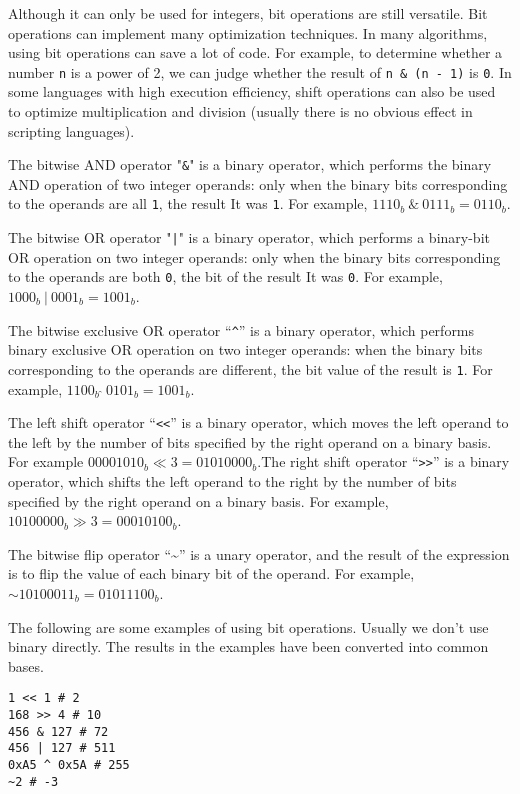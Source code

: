 Although it can only be used for integers, bit operations are still versatile. Bit operations can implement many optimization techniques. In many algorithms, using bit operations can save a lot of code. For example, to determine whether a number \texttt{n} is a power of 2, we can judge whether the result of \texttt{n \& (n - 1)} is \texttt{0}. In some languages   with high execution efficiency, shift operations can also be used to optimize multiplication and division (usually there is no obvious effect in scripting languages).

The bitwise AND operator "\texttt{\&}" is a binary operator, which performs the binary AND operation of two integer operands: only when the binary bits corresponding to the operands are all \texttt{1}, the result It was \texttt{1}. For example, $1110_b\ \&\ 0111_b = 0110_b$.

The bitwise OR operator "\texttt{|}" is a binary operator, which performs a binary-bit OR operation on two integer operands: only when the binary bits corresponding to the operands are both \texttt{0}, the bit of the result It was \texttt{0}. For example, $1000_b\ |\ 0001_b = 1001_b$.

The bitwise exclusive OR operator ``\texttt{\textasciicircum}'' is a binary operator, which performs binary exclusive OR operation on two integer operands: when the binary bits corresponding to the operands are different, the bit value of the result is \texttt{1}. For example, $1100_b\ \hat{}\ 0101_b = 1001_b$.

The left shift operator ``\texttt{<<}'' is a binary operator, which moves the left operand to the left by the number of bits specified by the right operand on a binary basis. For example $00001010_b \ll 3 = 01010000_b$.The right shift operator ``\texttt{>>}'' is a binary operator, which shifts the left operand to the right by the number of bits specified by the right operand on a binary basis. For example, $10100000_b \gg 3 = 00010100_b$.

The bitwise flip operator ``\textasciitilde'' is a unary operator, and the result of the expression is to flip the value of each binary bit of the operand. For example, $\mathtt{\sim}10100011_b = 01011100_b$.

The following are some examples of using bit operations. Usually we don't use binary directly. The results in the examples have been converted into common bases.
\begin{lstlisting}[language=berry, numbers=none]
1 << 1 # 2
168 >> 4 # 10
456 & 127 # 72
456 | 127 # 511
0xA5 ^ 0x5A # 255
~2 # -3
\end{lstlisting}

